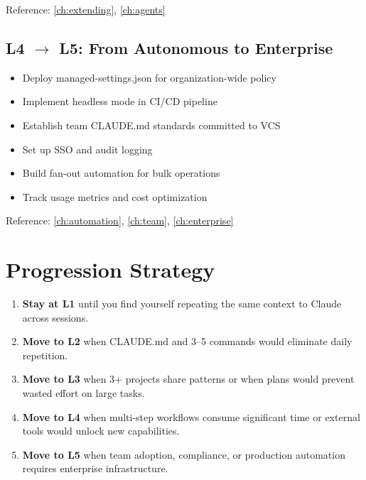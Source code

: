 Reference: \cref{ch:extending}, \cref{ch:agents}

\subsection{\texorpdfstring{L4 $\rightarrow$ L5}{L4 to L5}: From Autonomous to Enterprise}

\begin{itemize}
  \item[$\square$] Deploy managed-settings.json for organization-wide policy
  \item[$\square$] Implement headless mode in CI/CD pipeline
  \item[$\square$] Establish team CLAUDE.md standards committed to VCS
  \item[$\square$] Set up SSO and audit logging
  \item[$\square$] Build fan-out automation for bulk operations
  \item[$\square$] Track usage metrics and cost optimization
\end{itemize}

Reference: \cref{ch:automation}, \cref{ch:team}, \cref{ch:enterprise}

\section{Progression Strategy}


\begin{enumerate}
  \item \textbf{Stay at L1} until you find yourself repeating the same
    context to Claude across sessions.
  \item \textbf{Move to L2} when CLAUDE.md and 3--5 commands would
    eliminate daily repetition.
  \item \textbf{Move to L3} when 3+ projects share patterns
    or when plans would prevent wasted effort on large tasks.
  \item \textbf{Move to L4} when multi-step workflows consume
    significant time or external tools would unlock new capabilities.
  \item \textbf{Move to L5} when team adoption, compliance, or production
    automation requires enterprise infrastructure.
\end{enumerate}


